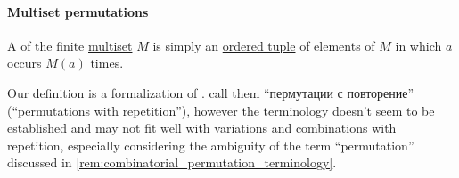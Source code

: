 \paragraph{Multiset permutations}

\begin{definition}\label{def:multiset_permutation}\mimprovised
  A  of the finite \hyperref[def:multiset]{multiset} \( M \) is simply an \hyperref[def:ordered_tuple]{ordered tuple} of elements of \( M \) in which \( a \) occurs \( M(a) \) times.
\end{definition}
\begin{comments}
  \item Our definition is a formalization of .  call them \enquote{пермутации с повторение} (\enquote{permutations with repetition}), however the terminology doesn't seem to be established and may not fit well with \hyperref[def:combinatorial_variation]{variations} and \hyperref[def:combinatorial_combination]{combinations} with repetition, especially considering the ambiguity of the term \enquote{permutation} discussed in \cref{rem:combinatorial_permutation_terminology}.
\end{comments}

